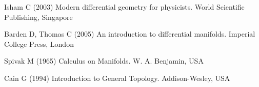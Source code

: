 %
%

%
% 
% 
%
\begin{thebibliography}{99.}
%
%
%
 Isham C (2003)
Modern differential geometry for physicists.
World Scientific Publishing, Singapore

 Barden D, Thomas C (2005)
An introduction to differential manifolds.
Imperial College Press, London

 Spivak M (1965)
Calculus on Manifolds.
W. A. Benjamin, USA

 Cain G (1994)
Introduction to General Topology.
Addison-Wesley, USA

%
%

\end{thebibliography}
